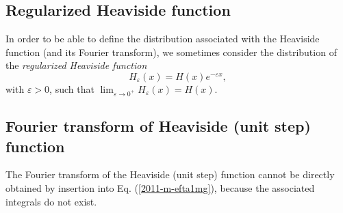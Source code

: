\subsection{Regularized Heaviside function}
In order to be able to define the distribution associated with the Heaviside function (and its Fourier transform), we sometimes
consider the distribution of the {\em regularized Heaviside function}
\begin{equation}
H_\varepsilon (x) =H(x)e^{-\varepsilon x},
\label{2012-m-ch-di-rhfun}
\end{equation}
 with $\varepsilon >0$,
such that $\lim_{\varepsilon \rightarrow 0^+}  H_\varepsilon (x) =H (x)$.



\subsection{Fourier transform  of  Heaviside (unit step) function}

The Fourier transform of the Heaviside (unit step) function
cannot be directly obtained by insertion into Eq. (\ref{2011-m-efta1mg}), because the associated integrals do not exist.

